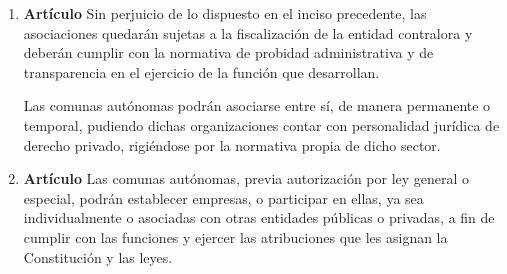 \documentclass[11pt, a4paper]{article}
\begin{document}
\begin{enumerate}
\item \textbf{Artículo} \newline
Sin perjuicio de lo dispuesto en el inciso precedente, las asociaciones quedarán sujetas a la fiscalización de la entidad contralora y deberán cumplir con la normativa de probidad administrativa y de transparencia en el ejercicio de la función que desarrollan. 

Las comunas autónomas podrán asociarse entre sí, de manera permanente o temporal, pudiendo dichas organizaciones contar con personalidad jurídica de derecho privado, rigiéndose por la normativa propia de dicho sector. 


\item \textbf{Artículo} \newline
Las comunas autónomas, previa autorización por ley general o especial, podrán establecer empresas, o participar en ellas, ya sea individualmente o asociadas con otras entidades públicas o privadas, a fin de cumplir con las funciones y ejercer las atribuciones que les asignan la Constitución y las leyes. 


\end{enumerate}
\end{document}
